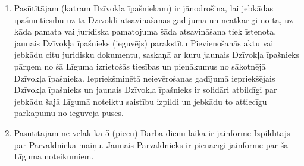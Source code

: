 \begin{multicols}{2}
\begin{enumerate}
	\item Pasūtītājam (katram Dzīvokļa īpašniekam) ir jānodrošina, lai jebkādas īpašumtiesību uz tā Dzīvokli atsavināšanas gadījumā un neatkarīgi no tā, uz kāda pamata vai juridiska pamatojuma šāda atsavināšana tiek īstenota, jaunais Dzīvokļa īpašnieks (ieguvējs) parakstītu Pievienošanās aktu vai jebkādu citu juridisku dokumentu, saskaņā ar kuru jaunais Dzīvokļa īpašnieks pārņem no šā Līguma izrietošās tiesības un pienākumus no sākotnējā Dzīvokļa īpašnieka. Iepriekšminētā neievērošanas gadījumā iepriekšējais Dzīvokļa īpašnieks un jaunais Dzīvokļa īpašnieks ir solidāri atbildīgi par jebkādu šajā Līgumā noteiktu saistību izpildi un jebkādu to attiecīgu pārkāpumu no ieguvēja puses.
	\item Pasūtītājam ne vēlāk kā 5 (piecu) Darba dienu laikā ir jāinformē Izpildītājs par Pārvaldnieka maiņu. Jaunais Pārvaldnieks ir pienācīgi jāinformē par šā Līguma noteikumiem.
\end{enumerate}
	

\end{multicols}

